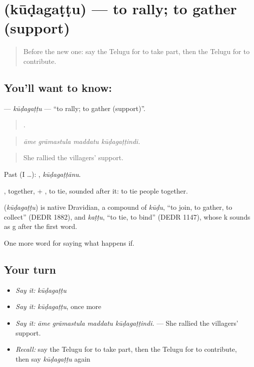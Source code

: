 \section[\texorpdfstring{\te{కూడగట్టు} (kūḍagaṭṭu)}{కూడగట్టు (kūḍagaṭṭu)}]{ (kūḍagaṭṭu) — to rally; to gather (support)}

\label{lesson:TE-C436-kudagattu}



\begin{quote}
Before the new one: say the Telugu for to take part, then the Telugu for to contribute.
\end{quote}

\subsection*{You'll want to know: }
\textbf{} — \emph{kūḍagaṭṭu} — \textquotedblleft{}to rally; to gather (support)\textquotedblright{}.

\begin{quote}
   .
\end{quote}

\begin{quote}
\emph{āme grāmastula maddatu kūḍagaṭṭindi.}
\end{quote}

\begin{quote}
She rallied the villagers’ support.
\end{quote}

Past (I …): , \emph{kūḍagaṭṭānu}.

, together, + , to tie, sounded  after it: to tie people together.

\begin{cousinweb}
\textbf{} (\emph{kūḍagaṭṭu}) is native Dravidian, a compound of \emph{kūḍu}, \textquotedblleft{}to join, to gather, to collect\textquotedblright{} (DEDR 1882), and \emph{kaṭṭu}, \textquotedblleft{}to tie, to bind\textquotedblright{} (DEDR 1147), whose k sounds as g after the first word.
\end{cousinweb}

\begin{grammarlens}[title={What you've built}]
One more word for saying what happens if.
\end{grammarlens}

\subsection*{Your turn}
\begin{itemize}
\raggedright
  \item \emph{Say it:} \emph{kūḍagaṭṭu}
  \item \emph{Say it:} \emph{kūḍagaṭṭu}, once more
  \item \emph{Say it:} \emph{āme grāmastula maddatu kūḍagaṭṭindi.} — She rallied the villagers’ support.
  \item \emph{Recall:} say the Telugu for to take part, then the Telugu for to contribute, then say \emph{kūḍagaṭṭu} again
\end{itemize}

